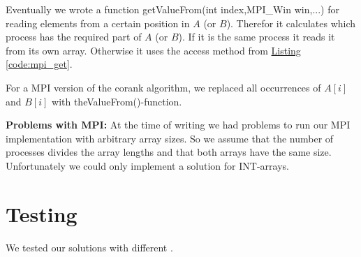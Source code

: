 Eventually we wrote a function getValueFrom(int index,MPI\_Win win,...) for reading elements from a certain position in $A$ (or $B$).
Therefor it calculates which process has the required part of $A$ (or $B$).
If it is the same process it reads it from its own array.
Otherwise it uses the access method from \hyperref[code:mpi_get]{Listing \ref*{code:mpi_get}}.

For a MPI version of the corank algorithm, we replaced all occurrences of $A[i]$ and $B[i]$ with theValueFrom()-function.


\textbf{Problems with MPI:}
At the time of writing we had problems to run our MPI implementation with arbitrary array sizes.
So we assume that the number of processes divides the array lengths and that both arrays have the same size.
Unfortunately we could only implement a solution for INT-arrays.

\section{Testing}
We tested our solutions with different .


